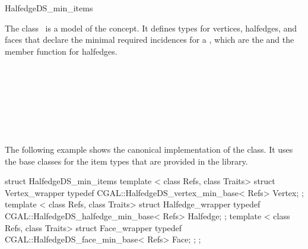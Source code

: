 
\ccRefPageBegin



\begin{ccRefClass}{HalfedgeDS_min_items}
\label{pageHalfedgeDSminitemsRef}

\ccDefinition
  
The class \ccRefName\ is a model of the 
concept.  It defines types for vertices, halfedges, and faces that
declare the minimal required incidences for a , which
are the  and the  member function for
halfedges.


\ccIsModel


\ccSeeAlso

\\
\\
\\
\\
\\
\\

\ccExample

The following example shows the canonical implementation of the
 class. It uses the base classes for the
item types that are provided in the library.

\begin{ccExampleCode}
struct HalfedgeDS_min_items {
    template < class Refs, class Traits>
    struct Vertex_wrapper {
        typedef CGAL::HalfedgeDS_vertex_min_base< Refs>   Vertex;
    };
    template < class Refs, class Traits>
    struct Halfedge_wrapper {
        typedef CGAL::HalfedgeDS_halfedge_min_base< Refs> Halfedge;
    };
    template < class Refs, class Traits>
    struct Face_wrapper {
        typedef CGAL::HalfedgeDS_face_min_base< Refs>     Face;
    };
};
\end{ccExampleCode}

\end{ccRefClass}

\ccRefPageEnd

